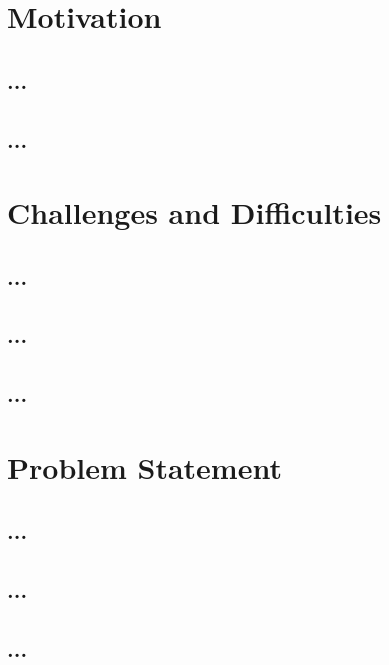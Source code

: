 \section{Motivation}
\subsection{...}


\subsection{...}


\section{Challenges and Difficulties}
\subsection{...}

\lipsum[11-15]

\subsection{...}

\subsection{...}



\section{Problem Statement}
\subsection{...}

\lipsum[21-30]

\subsection{...}


\subsection{...}
